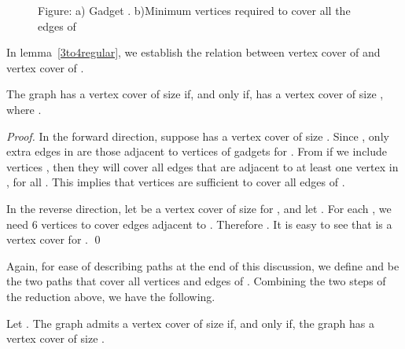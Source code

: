 \documentclass[svgnames]{llncs}
\begin{document}
{\begin{figure}
\caption{Figure: a) Gadget . b)Minimum vertices required to cover all the edges of }
\label{tildeJ}
\end{figure}

In lemma~\ref{3to4regular}, we establish the relation between vertex cover of  and vertex cover of .


\begin{lemma}The graph  has a vertex cover of size  if, and only if, has a vertex cover of size , where .
\label{3to4regular} 
\end{lemma}
\begin{proof}

In the forward direction, suppose  has a vertex cover of size .
Since , only extra edges in  are those adjacent to vertices of gadgets  for .
From  if we include vertices , then they will cover all edges that are adjacent to at least one vertex in , for all . This implies that  vertices are sufficient to cover all edges of .

In the reverse direction, let  be a vertex cover of size  for , and let . For each , we need 6 vertices to cover edges adjacent to .  Therefore . It is easy to see that  is a vertex cover for .
\qed
\end{proof}




\iffalse 
\begin{enumerate}
\item 

Since , only extra edges in  are those adjacent to vertices of gadgets  for .
From  if we include vertices , then they will cover all edges that are adjacent to at least one vertex in , for all .
This implies that  vertices are sufficient to cover .

\item 

Let .
For each  we need 6 vertices to cover edges adjacent to .  Therefore 
, otherwise if more vertices are included from  we can transform the vertex cover to contain exactly six vertex from . 
If  is not the vertex cover for  then  s.t. .But 
then , so  does not cover , a contradiction. So,  forms a .
\end{enumerate}
\fi


Again, for ease of describing paths at the end of this discussion, we define 
and  be the two paths that cover all vertices and edges of . Combining the two steps of the reduction above, we have the following.


\begin{corollary}
Let . The graph  admits a vertex cover of size  if, and only if, the graph  has a vertex cover of size . 
\label{WSDNPH}
\end{corollary}

}
\end{document}
